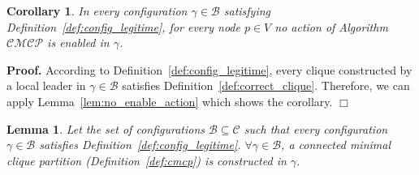 \documentclass[11pt,letterpaper,onecolumn]{article}
\newtheorem{corollary}{Corollary}
\newtheorem{lemma}{Lemma}
\newenvironment{proof}{\noindent \begin{rm}{\textbf{Proof.} }}{\hspace*{\fill}$\Box$\par\end{rm} \vspace{.3cm}}
\begin{document}
\begin{corollary}
\label{cor:no_enable_action}
In every configuration $\gamma \in \mathcal{B}$ satisfying Definition~\ref{def:config_legitime}, for every node $p \in V$ no action of Algorithm $\mathcal{CMCP}$ is enabled in $\gamma$.
\end{corollary}

\begin{proof}
According to Definition~\ref{def:config_legitime}, every clique constructed by a local leader in $\gamma \in \mathcal{B}$ satisfies Definition~\ref{def:correct_clique}. Therefore, we can apply Lemma~\ref{lem:no_enable_action} which shows the corollary.
\end{proof}

\begin{lemma}
\label{lem:sol_cmcp_config_legitime}
Let the set of configurations $\mathcal{B} \subseteq \mathcal{C}$ such that every configuration $\gamma \in \mathcal{B}$ satisfies Definition~\ref{def:config_legitime}. $\forall \gamma \in \mathcal{B}$, a connected minimal clique partition (Definition~\ref{def:cmcp}) is constructed in $\gamma$.
\end{lemma}
\end{document}
